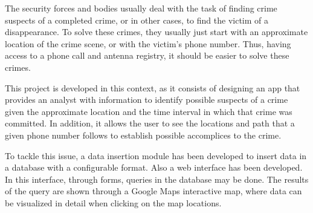 The security forces and bodies usually deal with the task of finding crime suspects of a completed crime, or in other cases, to find the victim of a disappearance.
To solve these crimes, they usually just start with an approximate location of the crime scene, or with the victim's phone number.
Thus, having access to a phone call and antenna registry, it should be easier to solve these crimes.


This project is developed in this context, as it consists of designing an app that provides an analyst with information to identify possible suspects of a crime given the approximate location and the time interval in which that crime was committed.
In addition, it allows the user to see the locations and path that a given phone number follows to establish possible accomplices to the crime.

To tackle this issue, a data insertion module has been developed to insert data in a database with a configurable format. 
Also a web interface has been developed. In this interface, through forms, queries in the database may be done.
The results of the query are shown through a Google Maps interactive map, where data can be visualized in detail when clicking on the map locations.


